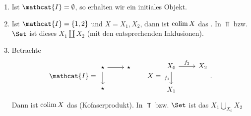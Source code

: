 
\begin{example}
    \begin{enumerate}[1)]
        \item Ist $\mathcat{I} = \emptyset$, so erhalten wir ein initiales Objekt.
        \item Ist $\mathcat{I} = \left \{1,2\right\} $ und $X = X_1,X_2$, dann ist $\operatorname{colim} X$ das  . In $\Top$ bzw.  $\Set$ ist dieses  $X_1 \coprod X_2$ (mit den entsprechenden Inklusionen).
        \item Betrachte
            \[
            \mathcat{I} = 
            \begin{tikzcd}
                \star \ar{r} \ar{d} & \star \\
                \star
            \end{tikzcd}
            \qquad
            X = 
            \begin{tikzcd}
                X_0 \ar{r}{f_2} \ar[swap]{d}{f_1}&X_2 \\
                X_1
            \end{tikzcd}
            .\] 
            Dann ist $\operatorname{colim} X$ das   (Kofaserprodukt). In $\Top$ bzw.  $\Set$ ist das  $X_1 \bigcup\limits_{X_0} X_2$ 
    \end{enumerate}
\end{example}
